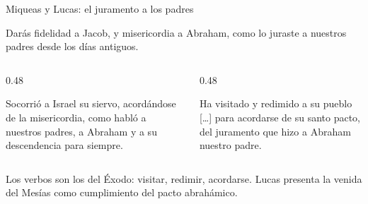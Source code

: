\begin{frame}{Miqueas y Lucas: el juramento a los padres}
\par\smallskip
\begin{cita}Darás fidelidad a Jacob, y misericordia a Abraham, como lo juraste a nuestros padres desde los días antiguos.\end{cita}
\begin{columns}[T,onlytextwidth]
\begin{column}{0.48\textwidth}
\begin{cita}[fontupper=\scriptsize\itshape]Socorrió a Israel su siervo, acordándose de la misericordia, como habló a nuestros padres, a Abraham y a su descendencia para siempre.\end{cita}
\end{column}
\begin{column}{0.48\textwidth}
\begin{cita}[fontupper=\scriptsize\itshape]Ha visitado y redimido a su pueblo [\ldots] para acordarse de su santo pacto, del juramento que hizo a Abraham nuestro padre.\end{cita}
\end{column}
\end{columns}
\begin{clave}
Los verbos son los del Éxodo: visitar, redimir, acordarse. Lucas presenta la venida del Mesías como cumplimiento del pacto abrahámico.
\end{clave}
\end{frame}

